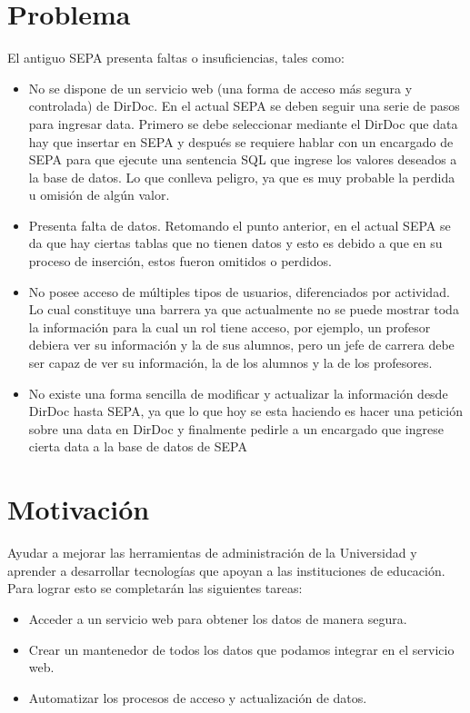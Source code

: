 \documentclass[a4paper,12pt,openany,oneside]{book}
\begin{document}
\section{Problema}
El antiguo SEPA presenta faltas o insuficiencias, tales como: 
\begin{itemize}
	\item No se dispone de un servicio web (una forma de acceso más segura y controlada) de DirDoc. En el actual SEPA se deben seguir una serie de pasos para ingresar data. Primero se debe seleccionar mediante el DirDoc que data hay que insertar en SEPA y después se requiere hablar con un encargado de SEPA para que ejecute una sentencia SQL que ingrese los valores deseados a la base de datos. Lo que conlleva peligro, ya que es muy probable la perdida u omisión de algún valor.
	\item Presenta falta de datos. Retomando el punto anterior, en el actual SEPA se da que hay ciertas tablas que no tienen datos y esto es debido a que en su proceso de inserción, estos fueron omitidos o perdidos.
	\item No posee acceso de múltiples tipos de usuarios, diferenciados por actividad. Lo cual constituye una barrera ya que actualmente no se puede mostrar toda la información para la cual un rol tiene acceso, por ejemplo, un profesor debiera ver su información y la de sus alumnos, pero un jefe de carrera debe ser capaz de ver su información, la de los alumnos y la de los profesores. 
	\item No existe una forma sencilla de modificar y actualizar la información desde DirDoc hasta SEPA, ya que lo que hoy se esta haciendo es hacer una petición sobre una data en DirDoc y finalmente pedirle a un encargado que ingrese cierta data a la base de datos de SEPA
\end{itemize} 
\section{Motivación}
Ayudar a mejorar las herramientas de administración de la Universidad y aprender a desarrollar tecnologías que apoyan a las instituciones de educación.
Para lograr esto se completarán las siguientes tareas:
\begin{itemize}
	\item Acceder a un servicio web para obtener los datos de manera segura.
	\item Crear un mantenedor de todos los datos que podamos integrar en el servicio web.
	\item Automatizar los procesos de acceso y actualización de datos.
\end{itemize}
\end{document}
